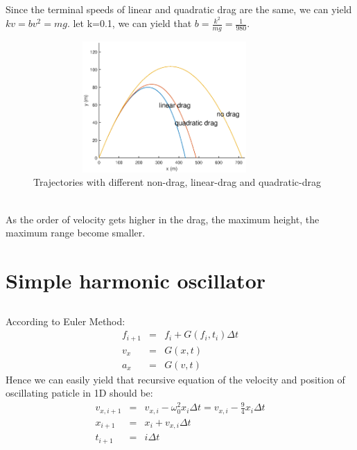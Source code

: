 \documentclass{article}
\begin{document}
\subsection{}
Since the terminal speeds of linear and quadratic drag are the same, we can yield $kv=bv^2=mg$. let k=0.1, we can yield that $b=\frac{k^2}{mg}=\frac{1}{980}$.
\begin{figure}[!htb] 
\centering 
\includegraphics[height=5cm,width=10cm]{linear_figure9.eps}
\caption{Trajectories with different non-drag, linear-drag and quadratic-drag}
\end{figure}
\noindent \\As the order of velocity gets higher in the drag, the maximum height, the maximum range become smaller.
\section{Simple harmonic oscillator}
\subsection{}
According to Euler Method:
\begin{eqnarray*}
	f_{i+1} & = & f_{i}+G(f_i,t_i) \Delta t\\
	v_x& =& G(x,t)\\
	a_x& =& G(v,t)
\end{eqnarray*}
Hence we can easily yield that recursive equation of the velocity and position of oscillating paticle in 1D should be:\\
\begin{eqnarray*}
	v_{x,i+1}&=& v_{x,i}-\omega_0^2x_i\Delta t=v_{x,i}-\frac{9}{4}x_i\Delta t\\
	x_{i+1}&=& x_i+v_{x,i}\Delta t\\
	t_{i+1}&=& i\Delta t
\end{eqnarray*}
\\
\end{document}
